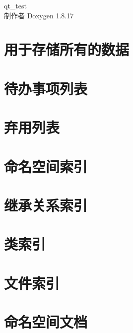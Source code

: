 \let\mypdfximage\pdfximage\def\pdfximage{\immediate\mypdfximage}\documentclass[twoside]{book}
\newcommand{\+}{\discretionary{\mbox{\scriptsize$\hookleftarrow$}}{}{}}
\newcommand{\clearemptydoublepage}{%
  \newpage{\pagestyle{empty}\cleardoublepage}%
}
\begin{document}
\begin{CJK}{UTF8}{min}

\hypersetup{pageanchor=false,
             bookmarksnumbered=true,
             pdfencoding=unicode
            }
\begin{titlepage}
\vspace*{7cm}
\begin{center}%
{\Large qt\+\_\+test }\\
\vspace*{1cm}
{\large 制作者 Doxygen 1.8.17}\\
\end{center}
\end{titlepage}
\clearemptydoublepage
{}
\tableofcontents
\clearemptydoublepage
{}
\hypersetup{pageanchor=true}

\chapter{用于存储所有的数据}
\label{md_src_Core_readme}

\chapter{待办事项列表}
\label{todo}

\chapter{弃用列表}
\label{deprecated}

\chapter{命名空间索引}

\chapter{继承关系索引}

\chapter{类索引}

\chapter{文件索引}

\chapter{命名空间文档}








\end{CJK}
\end{document}
